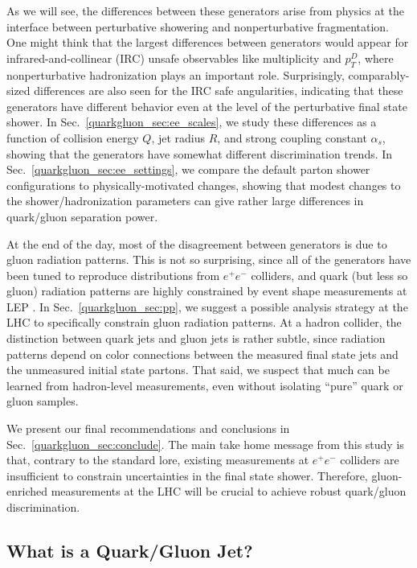 \documentclass[11pt]{cernrep}
\begin{document}
As we will see, the differences between these generators arise from
physics at the interface between perturbative showering and
nonperturbative fragmentation.  One might think that the largest
differences between generators would appear for infrared-and-collinear
(IRC) unsafe observables like multiplicity and $p_T^D$, where
nonperturbative hadronization plays an important role.  Surprisingly, comparably-sized differences are also
seen for the IRC safe angularities, indicating that these generators
have different behavior even at the level of the perturbative final
state shower.  In Sec.~\ref{quarkgluon_sec:ee_scales}, we study these
differences as a function of collision energy $Q$, jet radius $R$,
and strong coupling constant $\alpha_s$, showing that the generators
have somewhat different discrimination trends.  In
Sec.~\ref{quarkgluon_sec:ee_settings}, we compare the default parton
shower configurations to physically-motivated changes, showing that
modest changes to the shower/hadronization parameters can give rather
large differences in quark/gluon separation power.

At the end of the day, most of the disagreement between generators is due to gluon radiation patterns.  This is not so surprising, since all of the generators have been tuned to reproduce distributions from $e^+ e^-$ colliders, and quark (but less so gluon) radiation patterns are highly constrained by event shape measurements at LEP \cite{Heister:2003aj,Abdallah:2003xz,Achard:2004sv,Abbiendi:2004qz}.  In Sec.~\ref{quarkgluon_sec:pp}, we suggest a possible analysis strategy at the LHC to specifically constrain gluon radiation patterns.  At a hadron collider, the distinction between quark jets and gluon jets is rather subtle, since radiation patterns depend on color connections between the measured final state jets and the unmeasured initial state partons.  That said, we suspect that much can be learned from hadron-level measurements, even without isolating ``pure'' quark or gluon samples.

We present our final recommendations and conclusions in
Sec.~\ref{quarkgluon_sec:conclude}.  The main take home message from
this study is that, contrary to the standard lore, existing
measurements at $e^+e^-$ colliders are insufficient to constrain
uncertainties in the final state shower.  Therefore, gluon-enriched
measurements at the LHC will be crucial to achieve robust quark/gluon
discrimination.

\subsection{What is a Quark/Gluon Jet?}
\label{quarkgluon_sec:def}
\end{document}
